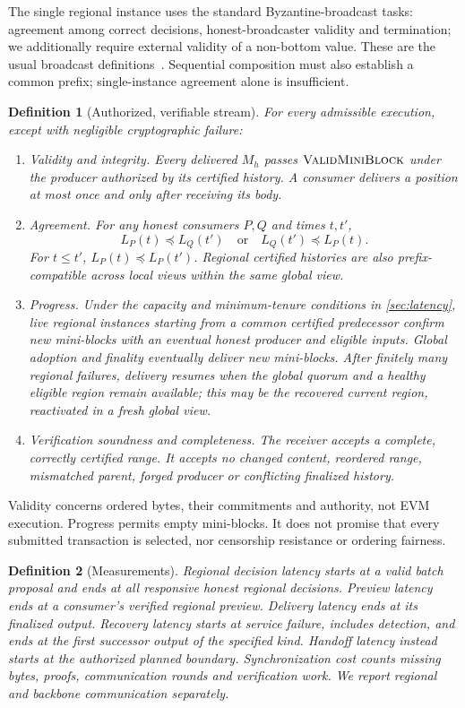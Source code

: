 \documentclass[11pt,a4paper,onecolumn]{article}
\newcommand{\pre}{\preceq}
\newcommand{\Proc}[1]{\textnormal{\textsc{#1}}}
\newtheorem{definition}{Definition}[section]
\theoremstyle{remark}\newtheorem{example}[definition]{Example}
\begin{document}
The single regional instance uses the standard Byzantine-broadcast tasks:
agreement among correct decisions, honest-broadcaster validity and termination;
we additionally require external validity of a non-bottom value. These are
the usual broadcast definitions~\cite{goodcase}. Sequential composition must
also establish a common prefix; single-instance agreement alone is insufficient.

\begin{definition}[Authorized, verifiable stream]\label{def:service}
For every admissible execution, except with negligible cryptographic failure:
\begin{enumerate}[label=\textnormal{(\roman*)}]
\item \emph{Validity and integrity.} Every delivered $M_h$ passes
$\Proc{ValidMiniBlock}$ under the producer authorized by its certified history.
A consumer delivers a position at most once and only after receiving its body.
\item \emph{Agreement.} For any honest consumers $P,Q$ and times $t,t'$,
\[
 L_P(t)\pre L_Q(t')\quad\text{or}\quad L_Q(t')\pre L_P(t).
\]
For $t\leq t'$, $L_P(t)\pre L_P(t')$. Regional certified histories are also
prefix-compatible across local views within the same global view.
\item \emph{Progress.} Under the capacity and minimum-tenure conditions in
\cref{sec:latency}, live regional instances starting from a common certified
predecessor confirm new mini-blocks with an eventual honest producer and
eligible inputs. Global adoption and finality eventually deliver new mini-blocks.
After finitely many regional failures, delivery resumes when the global quorum
and a healthy eligible region remain available; this may be the recovered
current region, reactivated in a fresh global view.
\item \emph{Verification soundness and completeness.} The receiver accepts a
complete, correctly certified range. It accepts no changed content, reordered
range, mismatched parent, forged producer or conflicting finalized history.
\end{enumerate}
\end{definition}
Validity concerns ordered bytes, their commitments and authority, not EVM
execution. Progress permits empty mini-blocks. It does not promise that every
submitted transaction is selected, nor censorship resistance or ordering fairness.

\begin{definition}[Measurements]\label{def:metrics}
Regional decision latency starts at a valid batch proposal and ends at all
responsive honest regional decisions. Preview latency ends at a consumer's
verified regional preview. Delivery latency ends at its finalized output.
Recovery latency starts at service failure, includes detection, and ends at
the first successor output of the specified kind. Handoff latency instead starts
at the authorized planned boundary. Synchronization cost counts missing bytes,
proofs, communication rounds and verification work. We report regional and
backbone communication separately.
\end{definition}
\end{document}

